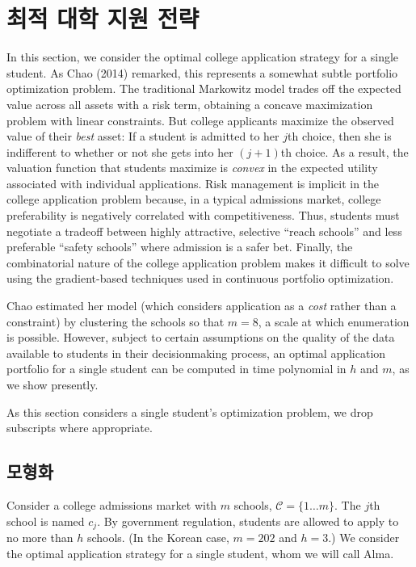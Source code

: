\documentclass[12pt]{article} %
\newif\ifEN
\theoremstyle{definition}
\theoremstyle{definition}
\begin{document}
\ifEN \section{The optimal college application strategy}  \else \section{최적 대학 지원 전략} \fi \label{optimalcollegeappstrat}
In this section, we consider the optimal college application strategy for a single student. As Chao (2014) remarked, this represents a somewhat subtle portfolio optimization problem. The traditional Markowitz model trades off the expected value across all assets with a risk term, obtaining a concave maximization problem with linear constraints. But college applicants maximize the observed value of their \emph{best} asset: If a student is admitted to her $j$th choice, then she is indifferent to whether or not she gets into her $(j+1)$th choice. As a result, the valuation function that students maximize is \emph{convex} in the expected utility associated with individual applications. Risk management is implicit in the college application problem because, in a typical admissions market, college preferability is negatively correlated with competitiveness. Thus, students must negotiate a tradeoff between highly attractive, selective “reach schools” and less preferable “safety schools” where admission is a safer bet. Finally, the combinatorial nature of the college application problem makes it difficult to solve using the gradient-based techniques used in continuous portfolio optimization.

Chao estimated her model (which considers application as a \emph{cost} rather than a constraint) by clustering the schools so that $m=8$, a scale at which enumeration is possible. However, subject to certain assumptions on the quality of the data available to students in their decisionmaking process, an optimal application portfolio for a single student can be computed in time polynomial in $h$ and $m$, as we show presently.

As this section considers a single student’s optimization problem, we drop subscripts where appropriate. 


\ifEN \subsection{Problem formulation}  \else \subsection{모형화} \fi
Consider a college admissions market with $m$ schools, $\mathcal{C} = \{ 1 \dots m\}$. The $j$th school is named $c_j$. By government regulation, students are allowed to apply to no more than $h$ schools. (In the Korean case, $m=202$ and $h=3$.) We consider the optimal application strategy for a single student, whom we will call Alma.
\end{document}
